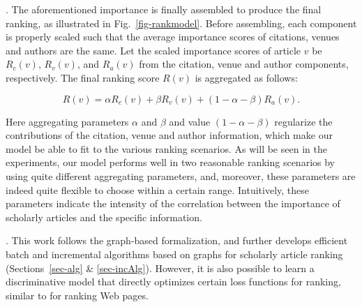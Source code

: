 

. The aforementioned importance is finally assembled to produce the final ranking, as illustrated in Fig.~\ref{fig-rankmodel}. Before assembling, each component is properly scaled such that the average importance scores of citations, venues and authors are the same.  Let the scaled importance scores of article $v$ be $R_c(v)$, $R_v(v)$, and $R_a(v)$ from the citation, venue and author components, respectively.
%
The final ranking score $R(v)$ is aggregated as follows:

\vspace{-1ex}
\begin{small}
\begin{equation} \label{eq-ensemble}
R(v) =  \alpha R_c(v) + \beta R_v(v) + (1 - \alpha - \beta) R_a(v).
\end{equation}
\end{small}
\noindent Here aggregating parameters $\alpha$ and $\beta$ and value $(1 - \alpha - \beta)$ regularize the contributions of the citation, venue and author information,
which make our model be able to fit to the various ranking scenarios. As will be seen in the experiments, our model performs well in two reasonable ranking scenarios by using quite different aggregating parameters, and, moreover, these parameters are indeed quite flexible to choose within a certain range.
Intuitively, these parameters indicate the intensity of the correlation between the importance of scholarly articles and the specific information.


. This work follows the graph-based formalization, and further develops efficient batch and incremental algorithms based on graphs for scholarly article ranking (Sections~\ref{sec-alg} \& \ref{sec-incAlg}). However, it is also possible to learn a discriminative model that directly optimizes certain loss functions for ranking, similar to \cite{Richardson06:BPR} for ranking Web pages.


